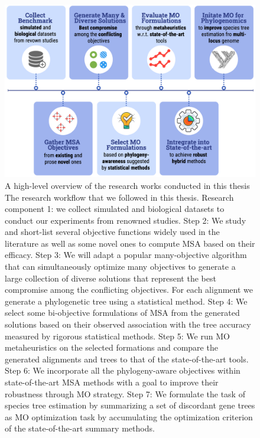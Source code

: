 \begin{figure}[!htbp]
	\centering
	\includegraphics[width=1.0\textwidth]{Figure/research-workflow}
	\caption[]{A high-level overview of the research works conducted in this thesis
		The research workflow that we followed in this thesis. Research component 1: we collect simulated and biological datasets to conduct our experiments from renowned studies.
		Step 2: We study and short-list several objective functions widely used in the literature as well as some novel ones to compute MSA based on their efficacy.
		Step 3: We will adapt a popular many-objective algorithm that can simultaneously optimize many objectives to generate a large collection of diverse solutions that represent the best compromise among the conflicting objectives. For each alignment we generate a phylogenetic tree using a statistical method.
		Step 4: We select some bi-objective formulations of MSA from the generated solutions based on their observed association with the tree accuracy measured by rigorous statistical methods.
		Step 5: We run MO metaheuristics on the selected formations and compare the generated alignments and trees to that of the state-of-the-art tools.
		Step 6: We incorporate all the phylogeny-aware objectives within state-of-the-art MSA methods with a goal to improve their robustness through MO strategy.
		Step 7: We formulate the task of species tree estimation by summarizing a set of discordant gene trees as MO optimization task by accumulating the optimization criterion of the state-of-the-art summary methods.
	}
	\label{fig:research-workflow}
	
\end{figure}

